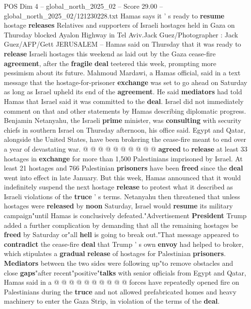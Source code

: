 \begin{textsample}{POS Dim 4 – global\_north\_2025\_02 – Score 29.00 – global\_north\_2025\_02/121230228.txt}  \label{ex:f4_pos_056}
Hamas says it ' s ready to \textbf{resume} hostage \textbf{releases} Relatives and supporters of Israeli hostages held in Gaza on Thursday blocked Ayalon Highway in Tel Aviv.Jack Guez/Photographer : Jack Guez/AFP/Gett JERUSALEM -- Hamas said on Thursday that it was ready to \textbf{release} Israeli hostages this weekend as laid out by the Gaza cease-fire \textbf{agreement}, after the \textbf{fragile} \textbf{deal} teetered this week, prompting more pessimism about its future.
Mahmoud Mardawi, a Hamas official, said in a text message that the hostage-for-prisoner \textbf{exchange} was set to go ahead on Saturday as long as Israel upheld its end of the \textbf{agreement}.
He said \textbf{mediators} had told Hamas that Israel said it was committed to the \textbf{deal}.
Israel did not immediately comment on that and other statements by Hamas describing diplomatic progress.
Benjamin Netanyahu, the Israeli \textbf{prime} minister, was \textbf{consulting} with security chiefs in southern Israel on Thursday afternoon, his office said.
Egypt and Qatar, alongside the United States, have been brokering the cease-fire meant to end over a year of devastating war. @ @ @ @ @ @ @ @ @ @ \textbf{agreed} to \textbf{release} at least 33 hostages in \textbf{exchange} for more than 1,500 Palestinians imprisoned by Israel.
At least 21 hostages and 766 Palestinian \textbf{prisoners} have been \textbf{freed} since the \textbf{deal} went into effect in late January.
But this week, Hamas announced that it would indefinitely suspend the next hostage \textbf{release} to protest what it described as Israeli violations of the \textbf{truce} ' s terms.
Netanyahu then threatened that unless hostages were \textbf{released} by \textbf{noon} Saturday, Israel would \textbf{resume} its military campaign"until Hamas is conclusively defeated."Advertisement \textbf{President} Trump added a further complication by demanding that all the remaining hostages be \textbf{freed} by Saturday or"all \textbf{hell} is going to break out."That message appeared to \textbf{contradict} the cease-fire \textbf{deal} that Trump ' s own \textbf{envoy} had helped to broker, which stipulates a \textbf{gradual} \textbf{release} of hostages for Palestinian \textbf{prisoners}. \textbf{Mediators} between the two sides were following up"to remove obstacles and close \textbf{gaps}"after recent"positive"\textbf{talks} with senior officials from Egypt and Qatar, Hamas said in a @ @ @ @ @ @ @ @ @ @ forces have repeatedly opened fire on Palestinians during the \textbf{truce} and not allowed prefabricated homes and heavy machinery to enter the Gaza Strip, in violation of the terms of the \textbf{deal}.

\end{textsample}
